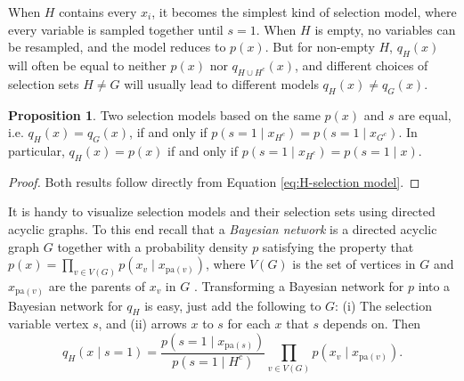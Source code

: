 \documentclass{article}
\theoremstyle{plain}
\theoremstyle{definition}
\newtheorem{prop}[theorem]{Proposition}
\begin{document}
When $H$ contains every $x_i$, it becomes the simplest kind of selection model, where every variable is sampled together until $s=1$. When $H$ is empty, no variables can be resampled, and the model reduces to $p\left(x\right)$. But for non-empty $H$, $q_{H}(x)$ will often be equal to neither $p(x)$ nor $q_{H\cup H^c}(x)$, and different choices of selection sets $H\neq G$ will usually lead to different models $q_{H}(x)\neq q_{G}(x)$. 
\begin{prop}
\label{prop:Equal selection models}Two selection models based on the same $p(x)$ and $s$ are equal, i.e. $q_{H}(x)=q_{G}(x)$, if and only if $p\left(s=1\mid x_{H^{c}}\right)=p\left(s=1\mid x_{G^{c}}\right)$.
In particular, $q_{H}(x)=p(x)$ if and only if $p\left(s=1\mid x_{H^{c}}\right)=p\left(s=1\mid x\right)$.
\end{prop}

\begin{proof}
Both results follow directly from Equation \eqref{eq:H-selection model}.
\end{proof}

It is handy to visualize selection models and their selection sets using directed acyclic graphs. To this end recall that a \emph{Bayesian network} is a directed acyclic graph $G$ together with a probability
density $p$ satisfying the property that $p\left(x\right)=\prod_{v\in V\left(G\right)}p\left(x_{v}\mid x_{\textrm{pa}\left(v\right)}\right)$, where $V\left(G\right)$ is the set of vertices in $G$ and $x_{\textrm{pa}\left(v\right)}$ are the parents of $x_{v}$ in $G$ \citep{Pearl2014}.
Transforming a Bayesian network for $p$ into a Bayesian network for $q_{H}$ is easy, just add the following to $G$: (i) The selection variable vertex $s$, and (ii) arrows $x$ to $s$ for each $x$ that $s$ depends on. Then
\begin{equation}
q_{H}\left(x\mid s=1\right)=\frac{p\left(s=1\mid x_{\textrm{pa}\left(s\right)}\right)}{p\left(s=1\mid H^{c}\right)}\prod_{v\in V\left(G\right)}p\left(x_{v}\mid x_{\textrm{pa}\left(v\right)}\right)\label{eq:DAG, selection model}.
\end{equation}
\end{document}
